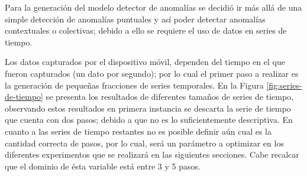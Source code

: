 Para la generaci\'{o}n del modelo detector de anomal\'{i}as se decidi\'{o} ir m\'{a}s all\'{a} de una simple detecci\'{o}n de anomal\'{i}as puntuales y as\'{i} poder detectar anomal\'{i}as contextuales o colectivas; debido a ello se requiere el uso de datos en series de tiempo.

\vspace{5mm} %

Los datos capturados por el dispositivo m\'{o}vil, dependen del tiempo en el que fueron capturados (un dato por segundo); por lo cual el primer paso a realizar es la generaci\'{o}n de peque\~{n}as fracciones de series temporales. En la Figura \ref{fig:series-de-tiempo} se presenta los resultados de diferentes tama\~{n}os de series de tiempo, observando estos resultados en primera instancia se descarta la serie de tiempo que cuenta con dos pasos; debido a que no es lo suficientemente descriptiva. En cuanto a las series de tiempo restantes no es posible definir a\'{u}n cual es la cantidad correcta de pasos, por lo cual, ser\'{a} un par\'{a}metro a optimizar en los diferentes experimentos que se realizar\'{a} en las siguientes secciones. Cabe recalcar que el dominio de \'{e}sta variable est\'{a} entre 3 y 5 pasos.

